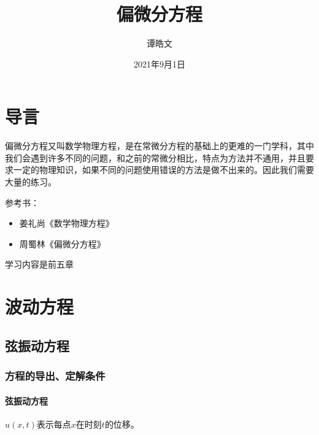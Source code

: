 \documentclass[
]{book}
\title{偏微分方程}
\author{谭皓文}
\date{2021年9月1日}
\providecommand{\tightlist}{%
  \setlength{\itemsep}{0pt}\setlength{\parskip}{0pt}}
\begin{document}
\maketitle

{
\setcounter{tocdepth}{1}
\tableofcontents
}
\hypertarget{ux5bfcux8a00}{%
\chapter*{导言}\label{ux5bfcux8a00}}

偏微分方程又叫数学物理方程，是在常微分方程的基础上的更难的一门学科，其中我们会遇到许多不同的问题，和之前的常微分相比，特点为方法并不通用，并且要求一定的物理知识，如果不同的问题使用错误的方法是做不出来的。因此我们需要大量的练习。

参考书：

\begin{itemize}
\tightlist
\item
  姜礼尚《数学物理方程》
\item
  周蜀林《偏微分方程》
\end{itemize}

学习内容是前五章

\hypertarget{ux6ce2ux52a8ux65b9ux7a0b}{%
\chapter{波动方程}\label{ux6ce2ux52a8ux65b9ux7a0b}}

\hypertarget{ux5f26ux632fux52a8ux65b9ux7a0b}{%
\section{弦振动方程}\label{ux5f26ux632fux52a8ux65b9ux7a0b}}

\hypertarget{ux65b9ux7a0bux7684ux5bfcux51faux5b9aux89e3ux6761ux4ef6}{%
\subsection{方程的导出、定解条件}\label{ux65b9ux7a0bux7684ux5bfcux51faux5b9aux89e3ux6761ux4ef6}}

\hypertarget{ux5f26ux632fux52a8ux65b9ux7a0b-1}{%
\subsubsection{弦振动方程}\label{ux5f26ux632fux52a8ux65b9ux7a0b-1}}

\(u(x,t)\)表示每点\(x\)在时刻\(t\)的位移。
\end{document}
